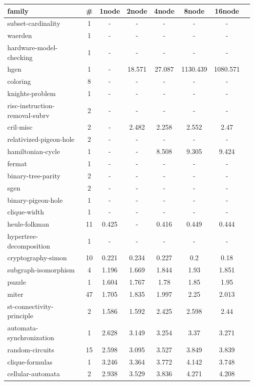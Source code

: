 \documentclass[12pt,a4paper,twoside]{scrartcl}
\numberwithin{equation}{section}
\begin{document}
\begin{longtable}{ lccccccc }
  \toprule
  family	&	\#	&	1node	&	2node	&	4node	&	8node	&	16node\\
  \midrule
  subset-cardinality	&	1	&	-	&	-	&	-	&	-	&	-\\
  waerden	&	1	&	-	&	-	&	-	&	-	&	-\\
  hardware-model-checking	&	1	&	-	&	-	&	-	&	-	&	-\\
  hgen	&	1	&	-	&	18.571	&	27.087	&	1130.439	&	1080.571\\
  coloring	&	8	&	-	&	-	&	-	&	-	&	-\\
  knights-problem	&	1	&	-	&	-	&	-	&	-	&	-\\
  risc-instruction-removal-subrv	&	2	&	-	&	-	&	-	&	-	&	-\\
  cril-misc	&	2	&	-	&	2.482	&	2.258	&	2.552	&	2.47\\
  relativized-pigeon-hole	&	2	&	-	&	-	&	-	&	-	&	-\\
  hamiltonian-cycle	&	1	&	-	&	-	&	8.508	&	9.305	&	9.424\\
  fermat	&	1	&	-	&	-	&	-	&	-	&	-\\
  binary-tree-parity	&	2	&	-	&	-	&	-	&	-	&	-\\
  sgen	&	2	&	-	&	-	&	-	&	-	&	-\\
  binary-pigeon-hole	&	1	&	-	&	-	&	-	&	-	&	-\\
  clique-width	&	1	&	-	&	-	&	-	&	-	&	-\\
  heule-folkman	&	11	&	0.425	&	-	&	0.416	&	0.449	&	0.444\\
  hypertree-decomposition	&	1	&	-	&	-	&	-	&	-	&	-\\
  cryptography-simon	&	10	&	0.221	&	0.234	&	0.227	&	0.2	&	0.18	\\
  subgraph-isomorphism	&	4	&	1.196	&	1.669	&	1.844	&	1.93	&	1.851	\\
  puzzle	&	1	&	1.604	&	1.767	&	1.78	&	1.85	&	1.95	\\
  miter	&	47	&	1.705	&	1.835	&	1.997	&	2.25	&	2.013	\\
  st-connectivity-principle	&	2	&	1.586	&	1.592	&	2.425	&	2.598	&	2.44	\\
  automata-synchronization	&	1	&	2.628	&	3.149	&	3.254	&	3.37	&	3.271	\\
  random-circuits	&	15	&	2.598	&	3.095	&	3.527	&	3.849	&	3.839	\\
  clique-formulas	&	1	&	3.246	&	3.364	&	3.772	&	4.142	&	3.748	\\
  cellular-automata	&	2	&	2.938	&	3.529	&	3.836	&	4.271	&	4.208	\\

\end{longtable}
\end{document}
